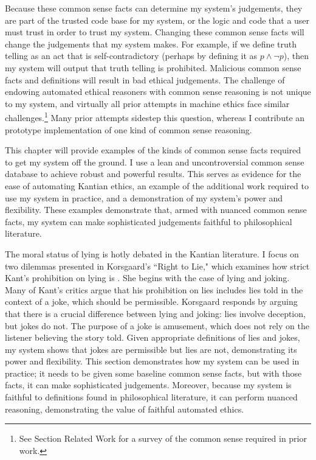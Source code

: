 \begin{isabellebody}
\begin{isamarkuptext}
Because these common sense facts can determine my system's judgements, they are part of the trusted
code base for my system, or the logic and code that a user must trust in order to trust my system. 
Changing these common sense facts will change the judgements 
that my system makes. For example, if we define truth telling as an act that is self-contradictory (perhaps
by defining it as $p \wedge \neg p$), then my system will output that truth telling is prohibited.
Malicious common sense facts and definitions will result in bad ethical judgements. 
The challenge of endowing automated ethical reasoners with common sense reasoning is not unique to my 
system, and virtually all prior attempts in machine ethics face similar challenges.\footnote{See Section
Related Work for a survey of the common sense required in prior work.} Many prior attempts
sidestep this question, whereas I contribute an prototype implementation of one kind of common sense reasoning.

This chapter will provide examples of the kinds of common sense facts required to get my system
off the ground. I use a lean and uncontroversial common sense database
to achieve robust and powerful results. This serves as evidence for the ease of automating
Kantian ethics, an example of the additional work required to use my system in practice, and a 
demonstration of my system's power and flexibility. These examples demonstrate that, armed with nuanced 
common sense facts, my system can make sophisticated judgements faithful to philosophical literature.%
\end{isamarkuptext}\isamarkuptrue%
%
\isadelimdocument
%
\endisadelimdocument
%
\isatagdocument
%
\isamarkuptrue%
%
\endisatagdocument
{\isafolddocument}%
%
\isadelimdocument
%
\endisadelimdocument
%
\begin{isamarkuptext}%
The moral status of lying is hotly debated in the Kantian literature. I focus on two dilemmas
presented in Korsgaard's ``Right to Lie," which 
examines how strict Kant's prohibition on lying is \citep{KorsgaardRTL}. She begins with the case of 
lying and joking. Many of Kant's critics argue that his prohibition on lies includes lies told in 
the context of a joke, which should be permissible. Korsgaard responds by arguing 
that there is a crucial difference between lying and joking: lies involve deception, but jokes do not. 
The purpose of a joke is amusement, which does not rely on the listener believing the story told. 
Given appropriate definitions of lies and jokes, my system shows that jokes are permissible but lies 
are not, demonstrating its power and flexibility. This section demonstrates how my system can be used 
in practice; it needs to be given some baseline common sense facts, but with those facts, it can make 
sophisticated judgements. Moreover, because my system is faithful to definitions found in philosophical 
literature, it can perform nuanced reasoning, demonstrating the value of faithful automated ethics. 


\end{isamarkuptext}
\end{isabellebody}
